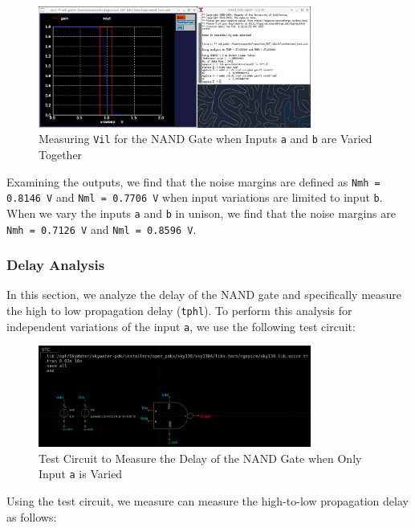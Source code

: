 \documentclass[fleqn]{article}
\begin{document}
	\begin{figure}[H]
		\centerline{\includegraphics[width=0.8\textwidth]{nand_noise_analysis_sweep_va_vb.png}}
		\caption{Measuring \texttt{Vil} for the NAND Gate when Inputs \texttt{a} and \texttt{b} are Varied Together}
		\label{fig::nand_noise_analysis_sweep_va_vb}
	\end{figure}
	
	Examining the outputs, we find that the noise margins are defined as \texttt{Nmh = 0.8146 V} and \texttt{Nml = 0.7706 V} when input variations are limited to input \texttt{b}. When we vary the inputs \texttt{a} and \texttt{b} in unison, we find that the noise margins are \texttt{Nmh = 0.7126 V} and \texttt{Nml = 0.8596 V}.
	
	\subsubsection{Delay Analysis}
	
	In this section, we analyze the delay of the NAND gate and specifically measure the high to low propagation delay (\texttt{tphl}). To perform this analysis for independent variations of the input \texttt{a}, we use the following test circuit:
	
	\begin{figure}[H]
		\centerline{\includegraphics[width=0.8\textwidth]{nand_delay_test_sweep_va.png}}
		\caption{Test Circuit to Measure the Delay of the NAND Gate when Only Input \texttt{a} is Varied}
		\label{fig::nand_delay_test_sweep_va}
	\end{figure}
	
	Using the test circuit, we measure can measure the high-to-low propagation delay as follows:
	
\end{document}
